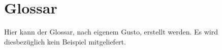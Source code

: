 
\section{Glossar}

Hier kann der Glossar, nach eigenem Gusto, erstellt werden.
Es wird diesbezüglich kein Beispiel mitgeliefert.

